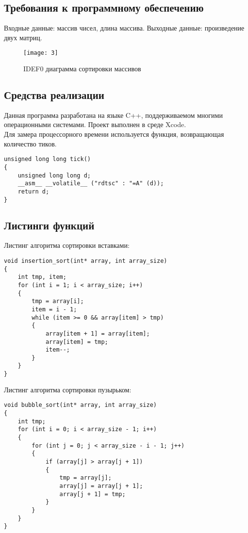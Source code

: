 \documentclass[a4paper, 14pt]{article}
\begin{document}
	\subsection{Требования к программному обеспечению}
	Входные данные: массив чисел, длина массива.
	Выходные данные: произведение двух матриц.

	\begin{figure}[H]
        	\begin{center}
        		{\texttt{[image: 3]}}
        		\caption{IDEF0 диаграмма сортировки массивов}
        	\end{center}
        \end{figure}
	
	\subsection{Средства реализации}
	
		Данная программа разработана на языке C++, поддерживаемом многими операционными системами. Проект выполнен в среде Xcode. \\
	
	Для замера процессорного времени используется функция, возвращающая количество тиков.
	
	\begin{lstlisting}[label=some-code,caption=Функция замера количества тиков]
unsigned long long tick()
{
    unsigned long long d;
    __asm__ __volatile__ ("rdtsc" : "=A" (d));
    return d;
}
\end{lstlisting}

\newpage
\subsection{Листинги функций}

Листинг алгоритма сортировки вставками:
\begin{lstlisting}[label=some-code,caption=Сортировка вставками]
void insertion_sort(int* array, int array_size)
{
    int tmp, item;
    for (int i = 1; i < array_size; i++)
    {
        tmp = array[i];
        item = i - 1;
        while (item >= 0 && array[item] > tmp)
        {
            array[item + 1] = array[item];
            array[item] = tmp;
            item--;
        }
    }
}
\end{lstlisting}

Листинг алгоритма сортировки пузырьком:

	\begin{lstlisting}[label=some-code,caption=Сортировка пузырьком]
void bubble_sort(int* array, int array_size)
{
    int tmp;
    for (int i = 0; i < array_size - 1; i++)
    {
        for (int j = 0; j < array_size - i - 1; j++)
        {
            if (array[j] > array[j + 1])
            {
                tmp = array[j];
                array[j] = array[j + 1];
                array[j + 1] = tmp;
            }
        }
    }
}
\end{lstlisting}
\end{document}
